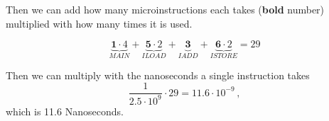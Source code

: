 Then we can add how many microinstructions each takes (\textbf{bold} number) multiplied with how many times it is used.

\begin{equation}
    \underbrace{\mathbf 1 \cdot 4}_{MAIN} + \underbrace{\mathbf 5 \cdot 2}_{ILOAD} + \underbrace{\mathbf 3}_{IADD} + \underbrace{\mathbf 6 \cdot 2}_{ISTORE} = 29
\end{equation}

Then we can multiply with the nanoseconds a single instruction takes
\begin{equation}
    \frac 1 {2.5 \cdot 10^9} \cdot 29 = 11.6 \cdot 10^{-9}\,,
\end{equation}
which is 11.6 Nanoseconds.

